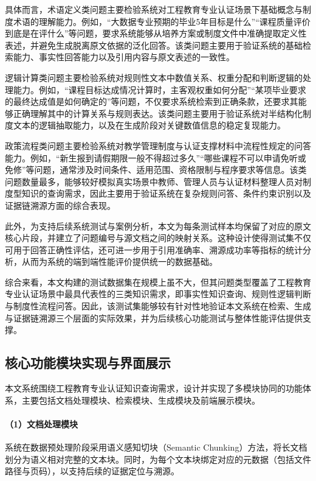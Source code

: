 \documentclass[UTF8,a4paper,zihao=-4]{ctexart}
\begin{document}
具体而言，术语定义类问题主要检验系统对工程教育专业认证场景下基础概念与制度术语的理解能力。例如，“大数据专业预期的毕业5年目标是什么”“课程质量评价到底是在评什么”等问题，要求系统能够从培养方案或制度文件中准确提取定义性表述，并避免生成脱离原文依据的泛化回答。该类问题主要用于验证系统的基础检索能力、事实性回答能力以及引用内容与原文表述的一致性。

逻辑计算类问题主要检验系统对规则性文本中数值关系、权重分配和判断逻辑的处理能力。例如，“课程目标达成情况计算时，主客观权重如何分配”“某项毕业要求的最终达成值是如何确定的”等问题，不仅要求系统检索到正确条款，还要求其能够正确理解其中的计算关系与规则表达。该类问题主要用于验证系统对半结构化制度文本的逻辑抽取能力，以及在生成阶段对关键数值信息的稳定复现能力。

政策流程类问题主要检验系统对教学管理制度与认证支撑材料中流程性规定的问答能力。例如，“新生报到请假期限一般不得超过多久”“哪些课程不可以申请免听或免修”等问题，通常涉及时间条件、适用范围、资格限制与程序要求等信息。该类问题数量最多，能够较好模拟真实场景中教师、管理人员与认证材料整理人员对制度型知识的查询需求，因此主要用于验证系统在复杂规则问答、条件约束识别以及证据链溯源方面的综合表现。

此外，为支持后续系统测试与案例分析，本文为每条测试样本均保留了对应的原文核心片段，并建立了问题编号与源文档之间的映射关系。这种设计使得测试集不仅可用于回答正确性评估，还可进一步用于引用准确率、溯源成功率等指标的统计分析，从而为系统的端到端性能评价提供统一的数据基础。

综合来看，本文构建的测试数据集在规模上虽不大，但其问题类型覆盖了工程教育专业认证场景中最具代表性的三类知识需求，即事实性知识查询、规则性逻辑判断与制度性流程问答。因此，该测试集能够较有针对性地验证本文系统在检索、生成与证据链溯源三个层面的实际效果，并为后续核心功能测试与整体性能评估提供支撑。

\subsection{核心功能模块实现与界面展示}

本文系统围绕工程教育专业认证知识查询需求，设计并实现了多模块协同的功能体系，主要包括文档处理模块、检索模块、生成模块及前端展示模块。

\paragraph{（1）文档处理模块}

系统在数据预处理阶段采用语义感知切块（Semantic Chunking）方法，将长文档划分为语义相对完整的文本块。同时，为每个文本块绑定对应的元数据（包括文件路径与页码），以支持后续的证据定位与溯源。
\end{document}
